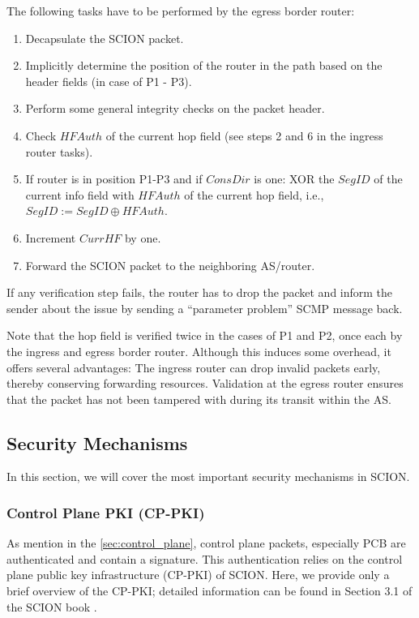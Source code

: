 The following tasks have to be performed by the egress border router:
\begin{enumerate}
    \item Decapsulate the SCION packet.
    \item Implicitly determine the position of the router in the path based on the header fields (in case of P1 - P3).
    \item Perform some general integrity checks on the packet header.
    \item Check $HFAuth$ of the current hop field (see steps 2 and 6 in the ingress router tasks).
    \item If router is in position P1-P3 and if $ConsDir$ is one: XOR the $SegID$ of the current info field with $HFAuth$ of the current hop field, i.e., $SegID := SegID \oplus HFAuth$.
    \item Increment $CurrHF$ by one.
    \item Forward the SCION packet to the neighboring AS/router.
\end{enumerate}


If any verification step fails, the router has to drop the packet and inform the sender about the issue by sending a ``parameter problem'' SCMP message back.

Note that the hop field is verified twice in the cases of P1 and P2, once each by the ingress and egress border router.
Although this induces some overhead, it offers several advantages:
The ingress router can drop invalid packets early, thereby conserving forwarding resources.
Validation at the egress router ensures that the packet has not been tampered with during its transit within the AS.


\subsection{Security Mechanisms}
In this section, we will cover the most important security mechanisms in SCION.


\subsubsection{Control Plane PKI (CP-PKI)}
\label{sec:cp_pki}
As mention in the \cref{sec:control_plane}, control plane packets, especially PCB are authenticated and contain a signature.
This authentication relies on the control plane public key infrastructure (CP-PKI) of SCION.
Here, we provide only a brief overview of the CP-PKI; detailed information can be found in Section 3.1 of the SCION book \cite{Perrig2022}.

